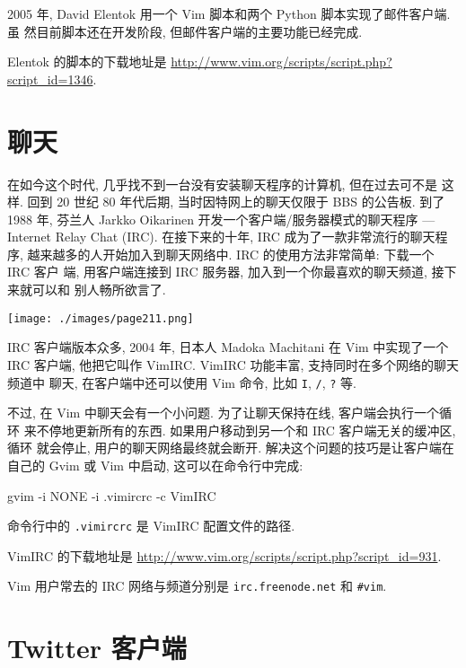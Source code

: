 2005 年, David Elentok 用一个 Vim 脚本和两个 Python 脚本实现了邮件客户端. 虽
然目前脚本还在开发阶段, 但邮件客户端的主要功能已经完成.

Elentok 的脚本的下载地址是
\url{http://www.vim.org/scripts/script.php?script_id=1346}.

\section{聊天}
\label{sec:chat_with_vim}

在如今这个时代, 几乎找不到一台没有安装聊天程序的计算机, 但在过去可不是
这样. 回到 20 世纪 80 年代后期, 当时因特网上的聊天仅限于 BBS 的公告板. 到了
1988 年, 芬兰人 Jarkko Oikarinen 开发一个客户端/服务器模式的聊天程序 ---
Internet Relay Chat (IRC). 在接下来的十年, IRC 成为了一款非常流行的聊天程序,
越来越多的人开始加入到聊天网络中. IRC 的使用方法非常简单: 下载一个 IRC 客户
端, 用客户端连接到 IRC 服务器, 加入到一个你最喜欢的聊天频道, 接下来就可以和
别人畅所欲言了.

\begin{center}
	\texttt{[image: ./images/page211.png]}
\end{center}

IRC 客户端版本众多, 2004 年, 日本人 Madoka Machitani 在 Vim 中实现了一个 IRC
客户端, 他把它叫作 VimIRC. VimIRC 功能丰富, 支持同时在多个网络的聊天频道中
聊天, 在客户端中还可以使用 Vim 命令, 比如 \texttt{I}, \texttt{/},
\texttt{?} 等.

不过, 在 Vim 中聊天会有一个小问题. 为了让聊天保持在线, 客户端会执行一个循环
来不停地更新所有的东西. 如果用户移动到另一个和 IRC 客户端无关的缓冲区, 循环
就会停止, 用户的聊天网络最终就会断开. 解决这个问题的技巧是让客户端在自己的
Gvim 或 Vim 中启动, 这可以在命令行中完成:
\begin{vimcode}
gvim -i NONE -i .vimircrc -c VimIRC
\end{vimcode}
命令行中的 \texttt{.vimircrc} 是 VimIRC 配置文件的路径.

VimIRC 的下载地址是 \url{http://www.vim.org/scripts/script.php?script_id=931}.

\begin{warning}
    Vim 用户常去的 IRC 网络与频道分别是 \texttt{irc.freenode.net} 和
    \texttt{\#vim}.
\end{warning}

\section{Twitter 客户端}
\label{sec:using_vim_as_a_twitter_client}

